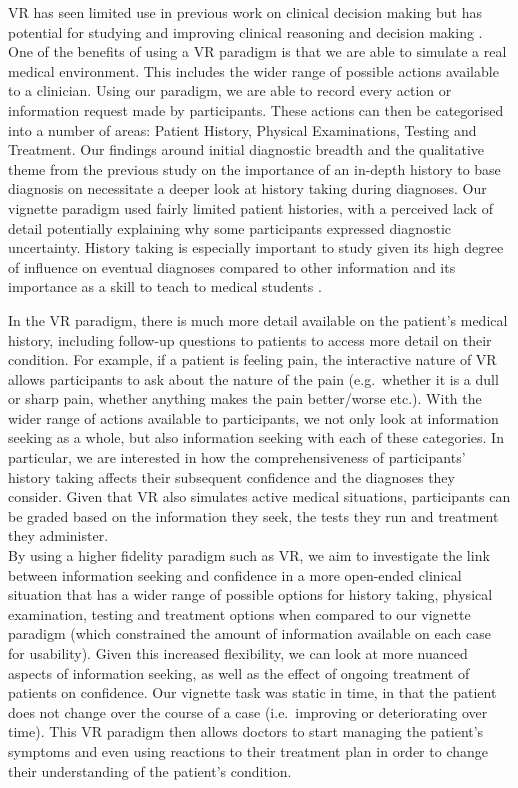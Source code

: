 \documentclass[a4paper, nobind]{templates/ociamthesis}
\begin{document}
\hfill\break
VR has seen limited use in previous work on clinical decision making but has potential for studying and improving clinical reasoning and decision making \autocite{jans_examining_2023}. One of the benefits of using a VR paradigm is that we are able to simulate a real medical environment. This includes the wider range of possible actions available to a clinician. Using our paradigm, we are able to record every action or information request made by participants. These actions can then be categorised into a number of areas: Patient History, Physical Examinations, Testing and Treatment. Our findings around initial diagnostic breadth and the qualitative theme from the previous study on the importance of an in-depth history to base diagnosis on necessitate a deeper look at history taking during diagnoses. Our vignette paradigm used fairly limited patient histories, with a perceived lack of detail potentially explaining why some participants expressed diagnostic uncertainty. History taking is especially important to study given its high degree of influence on eventual diagnoses compared to other information \autocite{hampton_relative_1975,sandler_importance_1980,peterson_contributions_1992} and its importance as a skill to teach to medical students \autocite{keifenheim_teaching_2015}.

\hfill\break
In the VR paradigm, there is much more detail available on the patient's medical history, including follow-up questions to patients to access more detail on their condition. For example, if a patient is feeling pain, the interactive nature of VR allows participants to ask about the nature of the pain (e.g.~whether it is a dull or sharp pain, whether anything makes the pain better/worse etc.). With the wider range of actions available to participants, we not only look at information seeking as a whole, but also information seeking with each of these categories. In particular, we are interested in how the comprehensiveness of participants' history taking affects their subsequent confidence and the diagnoses they consider. Given that VR also simulates active medical situations, participants can be graded based on the information they seek, the tests they run and treatment they administer.\\

By using a higher fidelity paradigm such as VR, we aim to investigate the link between information seeking and confidence in a more open-ended clinical situation that has a wider range of possible options for history taking, physical examination, testing and treatment options when compared to our vignette paradigm (which constrained the amount of information available on each case for usability). Given this increased flexibility, we can look at more nuanced aspects of information seeking, as well as the effect of ongoing treatment of patients on confidence. Our vignette task was static in time, in that the patient does not change over the course of a case (i.e.~improving or deteriorating over time). This VR paradigm then allows doctors to start managing the patient's symptoms and even using reactions to their treatment plan in order to change their understanding of the patient's condition.
\end{document}
